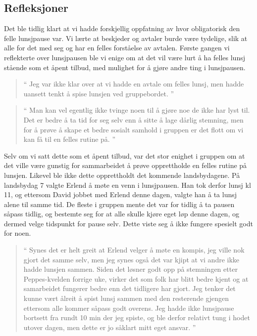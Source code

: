 \subsection*{Refleksjoner}
Det ble tidlig klart at vi hadde forskjellig oppfatning av hvor obligatorisk den felle lunsjpause var. Vi lærte at beskjeder og avtaler burde være tydelige, slik at alle for det med seg og har en felles forståelse av avtalen. Første gangen vi reflekterte over lunsjpausen ble vi enige om at det vil være lurt å ha felles lunsj stående som et åpent tilbud, med mulighet for å gjøre andre ting i lunsjpausen. 

\begin{quote}``
Jeg var ikke klar over at vi hadde en avtale om felles lunsj, men hadde uansett tenkt å spise lunsjen ved gruppebordet.
''\end{quote} 

\begin{quote}``
Man kan vel egentlig ikke tvinge noen til å gjøre noe de ikke har lyst til. Det er bedre å ta tid for seg selv enn å sitte å lage dårlig stemning, men for å prøve å skape et bedre sosialt samhold i gruppen er det flott om vi kan få til en felles rutine på.
''\end{quote} 

Selv om vi satt dette som et åpent tilbud, var det stor enighet i gruppen om at det ville være gunstig for sammarbeidet å prøve opprettholde en felles rutine på lunsjen. Likevel ble ikke dette opprettholdt det kommende landsbydagene. På landsbydag 7 valgte Erlend å møte en venn i lunsjpausen. Han tok derfor lunsj kl 11, og ettersom David jobbet med Erlend denne dagen, valgte han å ta lunsj alene til samme tid. De fleste i gruppen mente det var for tidlig å ta pausen såpass tidlig, og bestemte seg for at alle skulle kjøre eget løp denne dagen, og dermed velge tidspunkt for pause selv. Dette viste seg å ikke fungere spesielt godt for noen. 

\begin{quote}``
Synes det er helt greit at Erlend velger å møte en kompis, jeg ville nok gjort det samme selv, men jeg synes også det var kjipt at vi andre ikke hadde lunsjen sammen. Siden det løsner godt opp på stemningen etter Peppes-kvelden forrige uke, virker det som folk har blitt bedre kjent og at samarbeidet fungerer bedre enn det tidligere har gjort. Jeg tenker det kunne vært ålreit å spist lunsj sammen med den resterende gjengen ettersom alle kommer såpass godt overens. Jeg hadde ikke lunsjpause bortsett fra rundt 10 min der jeg spiste, og ble derfor relativt tung i hodet utover dagen, men dette er jo såklart mitt eget ansvar.
''\end{quote} 

